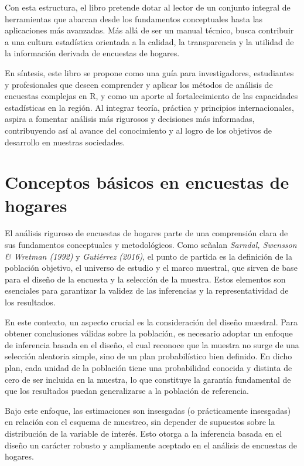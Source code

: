 \documentclass[
  12pt,
]{book}
\begin{document}
Con esta estructura, el libro pretende dotar al lector de un conjunto integral de herramientas que abarcan desde los fundamentos conceptuales hasta las aplicaciones más avanzadas. Más allá de ser un manual técnico, busca contribuir a una cultura estadística orientada a la calidad, la transparencia y la utilidad de la información derivada de encuestas de hogares.

En síntesis, este libro se propone como una guía para investigadores, estudiantes y profesionales que deseen comprender y aplicar los métodos de análisis de encuestas complejas en R, y como un aporte al fortalecimiento de las capacidades estadísticas en la región. Al integrar teoría, práctica y principios internacionales, aspira a fomentar análisis más rigurosos y decisiones más informadas, contribuyendo así al avance del conocimiento y al logro de los objetivos de desarrollo en nuestras sociedades.

\chapter{Conceptos básicos en encuestas de hogares}\label{conceptos-buxe1sicos-en-encuestas-de-hogares}

El análisis riguroso de encuestas de hogares parte de una comprensión clara de sus fundamentos conceptuales y metodológicos. Como señalan \emph{Sarndal, Swensson \& Wretman (1992)} y \emph{Gutiérrez (2016)}, el punto de partida es la definición de la población objetivo, el universo de estudio y el marco muestral, que sirven de base para el diseño de la encuesta y la selección de la muestra. Estos elementos son esenciales para garantizar la validez de las inferencias y la representatividad de los resultados.

En este contexto, un aspecto crucial es la consideración del diseño muestral. Para obtener conclusiones válidas sobre la población, es necesario adoptar un enfoque de inferencia basada en el diseño, el cual reconoce que la muestra no surge de una selección aleatoria simple, sino de un plan probabilístico bien definido. En dicho plan, cada unidad de la población tiene una probabilidad conocida y distinta de cero de ser incluida en la muestra, lo que constituye la garantía fundamental de que los resultados puedan generalizarse a la población de referencia.

Bajo este enfoque, las estimaciones son insesgadas (o prácticamente insesgadas) en relación con el esquema de muestreo, sin depender de supuestos sobre la distribución de la variable de interés. Esto otorga a la inferencia basada en el diseño un carácter robusto y ampliamente aceptado en el análisis de encuestas de hogares.
\end{document}
